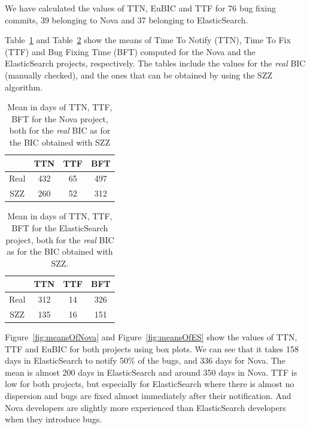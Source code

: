 \documentclass[10pt, conference]{IEEEtran}
\begin{document}
We have calculated the values of TTN, EuBIC and TTF for 76 bug fixing commits, 39 belonging to Nova and 37 belonging to ElasticSearch. %

Table~\ref{tableNova} and Table~\ref{tableES} show the means of Time To Notify (TTN), Time To Fix (TTF) and Bug Fixing Time (BFT) computed for the Nova and the ElasticSearch projects, respectively. The tables include the values for the \emph{real} BIC (manually checked), and the ones that can be obtained by using the SZZ algorithm.

\begin{table}[!t]
\renewcommand{\arraystretch}{1.3}
\centering
\caption{Mean in days of TTN, TTF, BFT for the Nova project, both for the \emph{real} BIC as for the BIC obtained with SZZ}
\label{tableNova}
\begin{tabular}{|c||c||c||c| }
\hline
  & TTN & TTF & BFT \\
\hline
Real & 432 & 65 & 497 \\
\hline
SZZ & 260 & 52 & 312\\
\hline
\end{tabular}
\end{table}

\begin{table}[!t]
\renewcommand{\arraystretch}{1.3}
\centering
\caption{Mean in days of TTN, TTF, BFT for the ElasticSearch project, both for the \emph{real} BIC as for the BIC obtained with SZZ.}
\label{tableES}
\begin{tabular}{|c||c||c||c| }
\hline
  & TTN & TTF & BFT \\
\hline
Real & 312 & 14 & 326 \\
\hline
SZZ & 135 & 16 & 151\\
\hline
\end{tabular}
\end{table}

Figure~\ref{fig:meansOfNova} and Figure~\ref{fig:meansOfES} show the values of TTN, TTF and EuBIC for both projects using box plots. We can see that it takes 158 days in ElasticSearch to notify 50\% of the bugs, and 336 days for Nova. The mean is almost 200 days in ElasticSearch and around 350 days in Nova. TTF is low for both projects, but especially for ElasticSearch where there is almost no dispersion and bugs are fixed almost immediately after their notification. And Nova developers are slightly more experienced than ElasticSearch developers when they introduce bugs.
\end{document}
